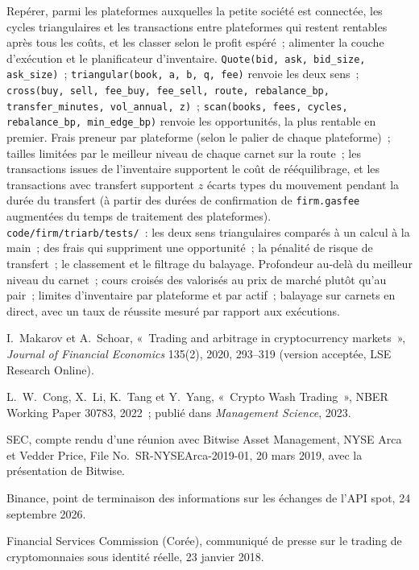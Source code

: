 \begin{build}
 Repérer, parmi les plateformes auxquelles la petite société est connectée, les cycles triangulaires et les transactions entre plateformes
qui restent rentables après tous les coûts, et les classer selon le profit espéré~; alimenter la couche d'exécution et le planificateur
d'inventaire.
 \texttt{Quote(bid, ask, bid\_size, ask\_size)}~; \texttt{triangular(book, a, b, q, fee)} renvoie
les deux sens~; \texttt{cross(buy, sell, fee\_buy, fee\_sell, route, rebalance\_bp, transfer\_minutes, vol\_annual,
z)}~; \texttt{scan(books, fees, cycles, rebalance\_bp, min\_edge\_bp)} renvoie les opportunités, la plus rentable en premier.
 Frais preneur par plateforme (selon le palier de chaque plateforme)~; tailles limitées par le meilleur niveau de chaque carnet sur la route~;
les transactions issues de l'inventaire supportent le coût de rééquilibrage, et les transactions avec transfert supportent $z$ écarts types du
mouvement pendant la durée du transfert (à partir des durées de confirmation de \texttt{firm.gasfee} augmentées du temps de traitement des plateformes).
 \texttt{code/firm/triarb/tests/}~: les deux sens triangulaires comparés à un calcul à la main~; des
frais qui suppriment une opportunité~; la pénalité de risque de transfert~; le classement et le filtrage du balayage.
 Profondeur au-delà du meilleur niveau du carnet~; cours croisés des  valorisés
au prix de marché plutôt qu'au pair~; limites d'inventaire par plateforme et par actif~; balayage sur carnets en direct, avec un taux de réussite mesuré par rapport aux exécutions.
\end{build}

\begin{omsources}
\item I.~Makarov et A.~Schoar, «~Trading and arbitrage in cryptocurrency markets~», \emph{Journal of Financial
Economics} 135(2), 2020, 293--319 (version acceptée, LSE Research Online).
\item L.~W.~Cong, X.~Li, K.~Tang et Y.~Yang, «~Crypto Wash Trading~», NBER Working Paper 30783, 2022~; publié dans
\emph{Management Science}, 2023.
\item SEC, compte rendu d'une réunion avec Bitwise Asset Management, NYSE Arca et Vedder Price, File No.\
SR-NYSEArca-2019-01, 20 mars 2019, avec la présentation de Bitwise.
\item Binance, point de terminaison des informations sur les échanges de l'API spot, 24 septembre 2026.
\item Financial Services Commission (Corée), communiqué de presse sur le trading de cryptomonnaies sous identité réelle, 23 janvier 2018.
\end{omsources}

